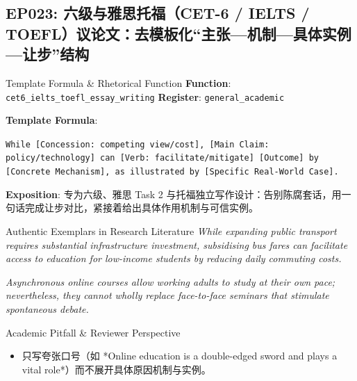 \subsection{EP023: 六级与雅思托福（CET-6 / IELTS / TOEFL）议论文：去模板化“主张---机制---具体实例---让步”结构}\label{sec:ep:EP023}
\begin{ConceptBox}{Template Formula \& Rhetorical Function}
\textbf{Function}: \texttt{cet6\_ielts\_toefl\_essay\_writing} \quad \textbf{Register}: \texttt{general\_academic}\par\vspace{3pt}
\textbf{Template Formula}:\par\noindent\texttt{While [Concession: competing view/cost], [Main Claim: policy/technology] can [Verb: facilitate/mitigate] [Outcome] by [Concrete Mechanism], as illustrated by [Specific Real-World Case].}\par\vspace{4pt}
\textbf{Exposition}: 专为六级、雅思 Task 2 与托福独立写作设计：告别陈腐套话，用一句话完成让步对比，紧接着给出具体作用机制与可信实例。
\end{ConceptBox}
\begin{ExampleBox}{Authentic Exemplars in Research Literature}
\textit{While expanding public transport requires substantial infrastructure investment, subsidising bus fares can facilitate access to education for low-income students by reducing daily commuting costs.}\par\vspace{2pt}
\textit{Asynchronous online courses allow working adults to study at their own pace; nevertheless, they cannot wholly replace face-to-face seminars that stimulate spontaneous debate.}\par\vspace{2pt}
\end{ExampleBox}
\begin{TipBox}{Academic Pitfall \& Reviewer Perspective}
\begin{itemize}[leftmargin=1.5em, itemsep=1pt]
  \item 只写夸张口号（如 *Online education is a double-edged sword and plays a vital role*）而不展开具体原因机制与实例。
\end{itemize}
\end{TipBox}
\vspace{6pt}
